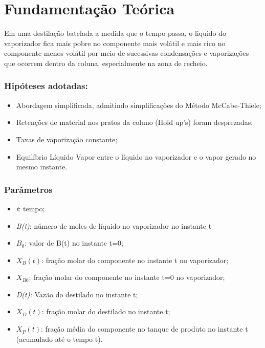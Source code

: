 \chapter{Fundamentação Teórica}

Em uma destilação batelada a medida que o tempo passa, o liquido do vaporizador fica mais pobre no componente mais volátil e mais rico no componente menos volátil por meio de sucessivas condensações e vaporizações que ocorrem dentro da coluna, especialmente na zona de recheio.

\subsection{Hipóteses adotadas:}

\begin{itemize}
	\item Abordagem simplificada, admitindo simplificações do Método McCabe-Thiele;
	\item Retenções de material nos pratos da coluno (Hold up's) foram desprezadas;
	\item Taxas de vaporização constante;
	\item Equilíbrio Líquido Vapor entre o líquido no vaporizador e o vapor gerado no mesmo instante.
\end{itemize}


\subsection{Parâmetros}

\begin{itemize}
	\item \emph{t}: tempo;
	\item \emph{B(t)}: número de moles de líquido no vaporizador no instante t
	\item \emph{$B_{0}$}: valor de B(t) no instante t=0;
	\item \emph{$X_{B}(t)$}: fração molar do componente no instante t no vaporizador;
	\item \emph{$X_{B0}$}: fração molar do componente no instante t=0 no vaporizador;
	\item \emph{ D(t): }Vazão do destilado no instante t;
	\item \emph{$X_{D}(t)$}: fração molar do destilado no instante t;
	\item \emph{$X_{P}(t)$}: fração média do componente no tanque de produto no instante t (acumulado até o tempo t).
\end{itemize}


